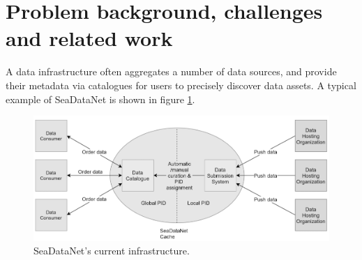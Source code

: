 \documentclass[conference]{IEEEtran}
\begin{document}

\section{Problem background, challenges and related work}

A data infrastructure often aggregates a number of data sources, and provide their metadata via catalogues for users to precisely discover data assets. A typical example of SeaDataNet is shown in figure \ref{fig:sdc_cur}. 
\begin{figure}[H]
\centering
\includegraphics[width=\columnwidth]{images/SDC_current.png}
\caption{SeaDataNet's current infrastructure.}
\label{fig:sdc_cur}
\end{figure}
\end{document}
